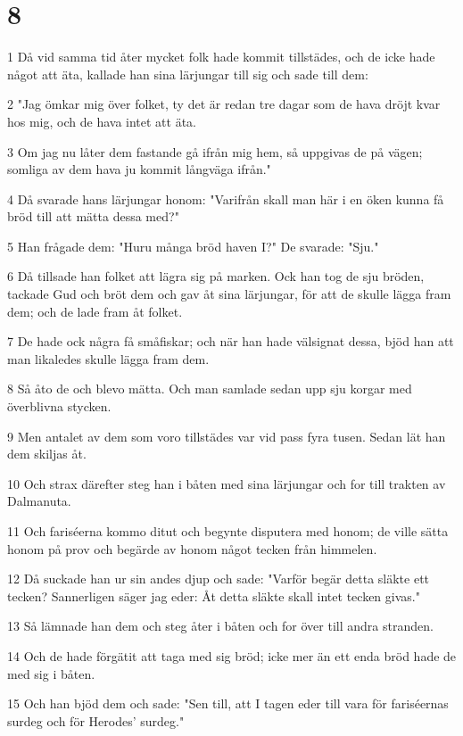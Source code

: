 \chapter{8}

\par 1 Då vid samma tid åter mycket folk hade kommit tillstädes, och de icke hade något att äta, kallade han sina lärjungar till sig och sade till dem:
\par 2 "Jag ömkar mig över folket, ty det är redan tre dagar som de hava dröjt kvar hos mig, och de hava intet att äta.
\par 3 Om jag nu låter dem fastande gå ifrån mig hem, så uppgivas de på vägen; somliga av dem hava ju kommit långväga ifrån."
\par 4 Då svarade hans lärjungar honom: "Varifrån skall man här i en öken kunna få bröd till att mätta dessa med?"
\par 5 Han frågade dem: "Huru många bröd haven I?" De svarade: "Sju."
\par 6 Då tillsade han folket att lägra sig på marken. Ock han tog de sju bröden, tackade Gud och bröt dem och gav åt sina lärjungar, för att de skulle lägga fram dem; och de lade fram åt folket.
\par 7 De hade ock några få småfiskar; och när han hade välsignat dessa, bjöd han att man likaledes skulle lägga fram dem.
\par 8 Så åto de och blevo mätta. Och man samlade sedan upp sju korgar med överblivna stycken.
\par 9 Men antalet av dem som voro tillstädes var vid pass fyra tusen. Sedan lät han dem skiljas åt.
\par 10 Och strax därefter steg han i båten med sina lärjungar och for till trakten av Dalmanuta.
\par 11 Och fariséerna kommo ditut och begynte disputera med honom; de ville sätta honom på prov och begärde av honom något tecken från himmelen.
\par 12 Då suckade han ur sin andes djup och sade: "Varför begär detta släkte ett tecken? Sannerligen säger jag eder: Åt detta släkte skall intet tecken givas."
\par 13 Så lämnade han dem och steg åter i båten och for över till andra stranden.
\par 14 Och de hade förgätit att taga med sig bröd; icke mer än ett enda bröd hade de med sig i båten.
\par 15 Och han bjöd dem och sade: "Sen till, att I tagen eder till vara för fariséernas surdeg och för Herodes' surdeg."
